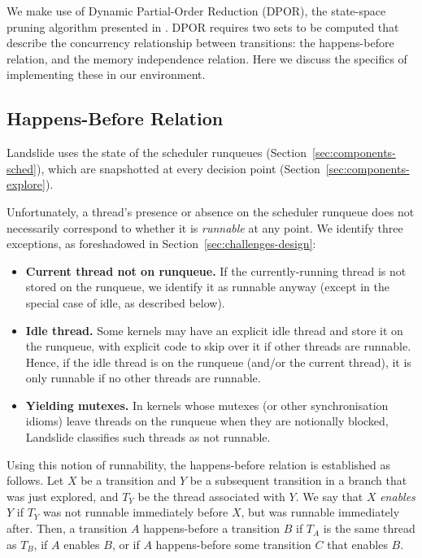 We make use of Dynamic Partial-Order Reduction (DPOR), the state-space pruning algorithm presented in \cite{dpor}. DPOR requires two sets to be computed that describe the concurrency relationship between transitions: the happens-before relation, and the memory independence relation. Here we discuss the specifics of implementing these in our environment.

\subsection{Happens-Before Relation}

 Landslide uses the state of the scheduler runqueues (Section~\ref{sec:components-sched}), which are snapshotted at every decision point (Section~\ref{sec:components-explore}).

Unfortunately, a thread's presence or absence on the scheduler runqueue does not necessarily correspond to whether it is {\em runnable} at any point. We identify three exceptions, as foreshadowed in Section~\ref{sec:challenges-design}:

\begin{itemize}
	\item {\bf Current thread not on runqueue.} If the currently-running thread is not stored on the runqueue, we identify it as runnable anyway (except in the special case of idle, as described below).
	\item {\bf Idle thread.} Some kernels may have an explicit idle thread and store it on the runqueue, with explicit code to skip over it if other threads are runnable. Hence, if the idle thread is on the runqueue (and/or the current thread), it is only runnable if no other threads are runnable.
	\item {\bf Yielding mutexes.} In kernels whose mutexes (or other synchronisation idioms) leave threads on the runqueue when they are notionally blocked, Landslide classifies such threads as not runnable.
\end{itemize}

Using this notion of runnability, the happens-before relation is established as follows. Let $X$ be a transition and $Y$ be a subsequent transition in a branch that was just explored, and $T_Y$ be the thread associated with $Y$. We say that $X$ {\em enables} $Y$ if $T_Y$ was not runnable immediately before $X$, but was runnable immediately after. Then, a transition $A$ happens-before a transition $B$ if $T_A$ is the same thread as $T_B$, if $A$ enables $B$, or if $A$ happens-before some transition $C$ that enables $B$.

